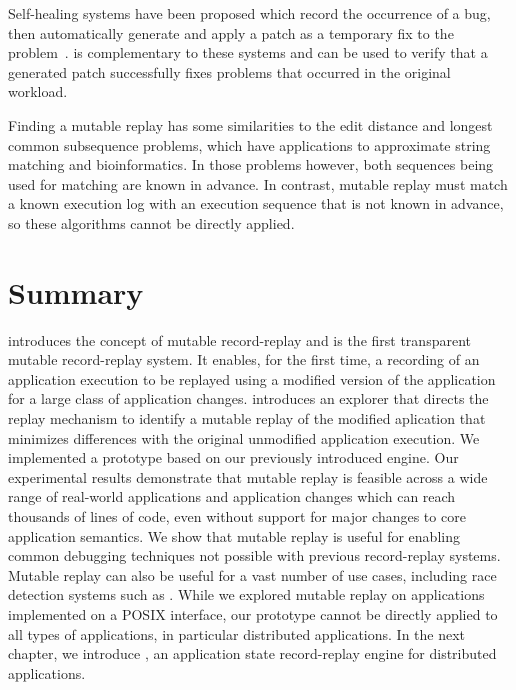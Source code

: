 Self-healing systems have been proposed which 
record the occurrence of a bug, then automatically generate and apply
a patch as a temporary fix to the problem~\cite{assure:asplos09}.
{\dora} is complementary
to these systems and can be used to
verify that a generated patch successfully fixes
problems that occurred in the original workload.

Finding a mutable replay has some similarities
to the edit distance and longest common subsequence
problems, which have applications to approximate string matching and
bioinformatics. In those problems however, both
sequences being used for matching are known in advance. In contrast,
mutable replay must match a known execution log with an
execution sequence that is not known in advance, so these algorithms cannot be
directly applied.

\section{Summary}
\label{dora:sec:conclusion}

{\dora} introduces the concept of mutable record-replay and is the first
transparent mutable record-replay system.  It enables, for the first time, a
recording of an application execution to be replayed using a modified version of
the application for a large class of application changes.  {\dora} introduces an
explorer that directs the replay mechanism to identify a mutable replay of the
modified aplication that minimizes differences with the original unmodified
application execution.
We implemented a \dora prototype based on our previously introduced \scribe engine.
Our experimental results demonstrate that
mutable replay is feasible across a wide range of real-world applications and
application changes which can reach thousands of lines of code, even without
support for major changes to core application semantics. We show that mutable
replay is useful for enabling common debugging techniques not possible with
previous record-replay systems. Mutable replay can also be useful for a vast
number of use cases, including race detection systems such as \racepro.
While we explored mutable replay on applications implemented on a POSIX
interface, our \dora prototype cannot be directly applied to all types of
applications, in particular distributed applications. In the next chapter, we
introduce \synapse, an application state record-replay engine for distributed
applications.

